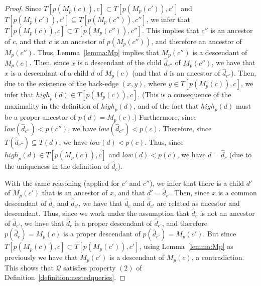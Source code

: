 \documentclass[11pt,a4paper]{article}
\begin{document}
\begin{proof}
Since $T[p(M_p(c)),c]\subset T[p(M_p(c')),c']$ and $T[p(M_p(c')),c']\subseteq T[p(M_p(c'')),c'']$, we infer that $T[p(M_p(c)),c]\subset T[p(M_p(c'')),c'']$. This implies that $c''$ is an ancestor of $c$, and that $c$ is an ancestor of $p(M_p(c''))$, and therefore an ancestor of $M_p(c'')$. Thus, Lemma~\ref{lemma:Mp} implies that $M_p(c'')$ is a descendant of $M_p(c)$. Then, since $x$ is a descendant of the child $\hat{d}_{c''}$ of $M_p(c'')$, we have that $x$ is a descendant of a child $d$ of $M_p(c)$ (and that $d$ is an ancestor of $\hat{d}_{c''}$). Then, due to the existence of the back-edge $(x,y)$, where $y\in T[p(M_p(c)),c]$, we infer that $\mathit{high}_p(d)\in T[p(M_p(c)),c]$. (This is a consequence of the maximality in the definition of $\mathit{high}_p(d)$, and of the fact that $\mathit{high}_p(d)$ must be a proper ancestor of $p(d)=M_p(c)$.) Furthermore, since $\mathit{low}(\hat{d}_{c''})<p(c'')$, we have $\mathit{low}(\hat{d}_{c''})<p(c)$. Therefore, since $T(\hat{d}_{c''})\subseteq T(d)$, we have $\mathit{low}(d)<p(c)$. Thus, since $\mathit{high}_p(d)\in T[p(M_p(c)),c]$ and $\mathit{low}(d)<p(c)$, we have $d=\hat{d}_c$ (due to the uniqueness in the definition of $\hat{d}_c$). 

With the same reasoning (applied for $c'$ and $c''$), we infer that there is a child $d'$ of $M_p(c')$ that is an ancestor of $x$, and that $d'=\hat{d}_{c'}$. Then, since $x$ is a common descendant of $\hat{d}_c$ and $\hat{d}_{c'}$, we have that $\hat{d}_c$ and $\hat{d}_{c'}$ are related as ancestor and descendant. Thus, since we work under the assumption that $\hat{d}_c$ is not an ancestor of $\hat{d}_{c'}$, we have that $\hat{d}_c$ is a proper descendant of $\hat{d}_{c'}$, and therefore $p(\hat{d}_c)=M_p(c)$ is a proper descendant of $p(\hat{d}_{c'})=M_p(c')$. But since $T[p(M_p(c)),c]\subset T[p(M_p(c')),c']$, using Lemma~\ref{lemma:Mp} as previously we have that $M_p(c')$ is a descendant of $M_p(c)$, a contradiction. This shows that $\mathcal{Q}$ satisfies property $(2)$ of Definition~\ref{definition:nestedqueries}.

\end{proof}
\end{document}
